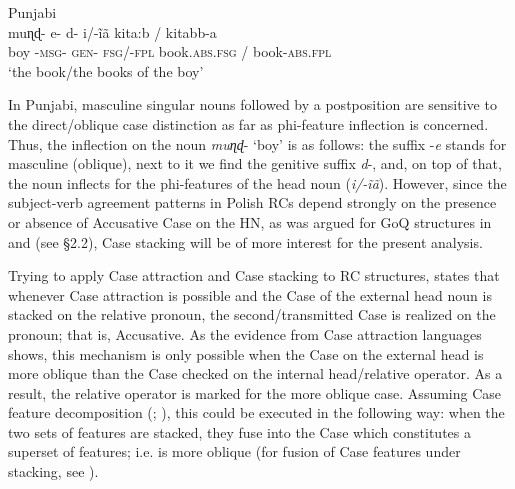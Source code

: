 \documentclass[output=paper]{langsci/langscibook}
\begin{document}
\ea%
         Punjabi \citep[316]{Manzini2015}\label{ex:leska:31}\\
    \gll muɳɖ- e-   d-   i/-\~iã     kita:b /      kitabb-a       \\
         boy   {}-\textsc{msg}{}- \textsc{gen}{}-   \textsc{fsg}/-\textsc{fpl}   book.\textsc{abs.fsg} /   book-\textsc{abs.fpl}\\
    \glt ‘the book\slash the books of the boy’                
\z

In Punjabi, masculine singular nouns followed by a postposition are sensitive to the direct\slash oblique case distinction as far as phi-feature inflection is concerned. Thus, the inflection on the noun \textit{muɳɖ}{}- ‘boy’ is as follows: the suffix -\textit{e} stands for masculine (oblique), next to it we find the genitive suffix \textit{d}{}-, and, on top of that, the noun inflects for the phi-features of the head noun (\textit{i/-\~iã}). However, since the subject-verb agreement patterns in Polish RCs depend strongly on the presence or absence of Accusative Case on the HN, as was argued for GoQ structures in \citet{Bošković2006} and \citealt{Witkoś2016} (see §2.2), Case stacking will be of more interest for the present analysis. 

Trying to apply Case attraction and Case stacking to RC structures, \citet{Łęska2016} states that whenever Case attraction is possible and the Case of the external head noun is stacked on the relative pronoun, the second\slash transmitted Case is realized on the pronoun; that is, Accusative. As the evidence from Case attraction languages shows, this mechanism is only possible when the Case on the external head is more oblique than the Case checked on the internal head\slash relative operator. As a result, the relative operator is marked for the more oblique case. Assuming Case feature decomposition (\citealt{Assmann2013}; \citealt{Georgi2014}), this could be executed in the following way: when the two sets of features are stacked, they fuse into the Case which constitutes a superset of features; i.e. is more oblique (for fusion of Case features under stacking, see \citealt{Assmann2014Stacking}).
\end{document}
